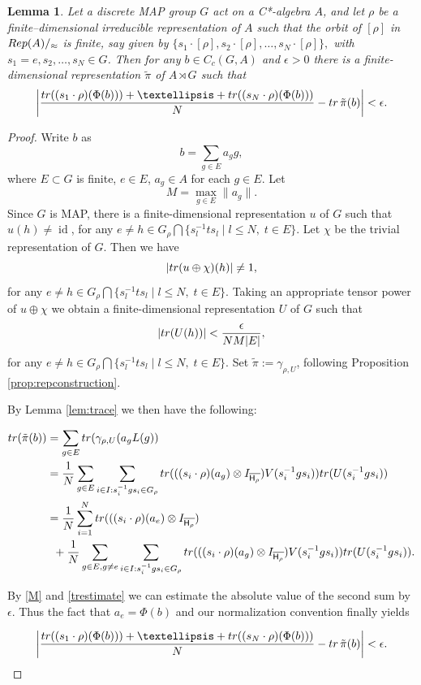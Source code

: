 \documentclass[11 pt, leqno, hidelinks]{amsart}%
\theoremstyle{plain}
\newtheorem{lemma}[theorem]{Lemma}
\numberwithin{equation}{section}
\newcommand{\tr}{\textup{tr}}
\newcommand{\Rep}{\textup{Rep}}
\newcommand{\id}[0]{\operatorname{id}}
\newcommand{\Hil}{\mathsf{H}}
\begin{document}
\begin{lemma}\label{MainLemma} Let a discrete MAP group $G$ act on a C*-algebra  $A$,  and let $\rho$ be a finite--dimensional irreducible representation of $A$ such that the orbit of $[\rho]$ in $\Rep(A)/_{\approx}$ is finite, say given by  $\{s_1\cdot [\rho], s_2\cdot[\rho], \ldots, s_N\cdot[\rho]\},$ with $s_1=e, s_2, \ldots, s_N \in G$. Then for any  $b\in C_c(G, A)$ and $\epsilon >0$ there is a finite-dimensional representation $\tilde\pi$ of $A\rtimes G$ such that
	$$\left|\frac{\tr ((s_1 \cdot\rho)(\Phi(b)))+\ldots + \tr((s_N \cdot\rho)(\Phi(b)))}{N} - \tr\,  \tilde\pi(b)\right| < \epsilon.$$
\end{lemma}
\begin{proof}
	Write $b$ as $$b = \sum_{g\in E} a_g g,$$ where $E\subset G$ is finite, $e \in E$, $ a_g \in A$ for each $g \in E$. Let
	\begin{equation}\label{M} M = \max_{g\in E} \|a_g\|.\end{equation}
	Since $G$ is MAP, there is  a finite-dimensional representation   $u$
	of $G$ such that $u(h) \neq \id$, for any $e\neq h\in G_{\rho}\bigcap \{s_l^{-1}ts_l\;|\; l\le N,\; t\in E\}$. Let $\chi$ be the trivial representation of $G$. Then we have
	$$|\tr ( u\oplus \chi)(h)|\neq 1,$$ for any $e\neq h\in G_{\rho}\bigcap \{s_l^{-1}ts_l\;|\; l\le N,\; t\in E\}$. Taking an appropriate tensor power of $ u \oplus \chi$ we obtain a finite-dimensional representation $U$ of $G$ such that
	\begin{equation}|\tr (U(h))|<\frac{\epsilon}{NM|E|},\label{trestimate}\end{equation} for any $e\neq h\in G_{\rho}\bigcap \{s_l^{-1}ts_l\;|\; l\le N,\; t\in E\}$.
	Set $\tilde{\pi}:=\gamma_{\rho, U}$, following Proposition \ref{prop:repconstruction}.
	
	By Lemma \ref{lem:trace} we then have the following:
	
	\begin{align*} \tr (\tilde \pi(b)) &= \sum_{g\in E}\tr (\gamma_{\rho, U}(a_gL(g)) \\&= \frac{1}{N} \sum_{g\in E} \sum_{i \in I: s_i^{-1}gs_i \in G_\rho}
		\textup{tr} (( (s_{i} \cdot \rho)(a_g) \otimes I_{\overline{\Hil_\rho}})V(s_i^{-1}g s_i))	\textup{tr}(U(s_i^{-1}g s_i))
		\\&= \frac{1}{N} \sum_{i=1}^N  \textup{tr} (( (s_{i} \cdot \rho)(a_e) \otimes I_{\overline{\Hil_\rho}}) \\&\;\;+   \frac{1}{N} \sum_{g\in E, g \neq e} \sum_{i \in I: s_i^{-1}gs_i \in G_\rho}
		\textup{tr} (( (s_{i} \cdot \rho)(a_g) \otimes I_{\overline{\Hil_\rho}})V(s_i^{-1}g s_i))	\textup{tr}(U(s_i^{-1}g s_i)).
	\end{align*}
	
	By \eqref{M} and \eqref{trestimate} we can  estimate the absolute value of the second sum by $\epsilon$. Thus the fact that $a_e = \Phi(b)$ and our normalization convention finally yields
	
	$$\left|\frac{\tr ((s_1 \cdot\rho)(\Phi(b)))+\ldots + \tr((s_N \cdot\rho)(\Phi(b)))}{N} - \tr\,  \tilde\pi(b)\right| < \epsilon.$$
	
\end{proof}
\end{document}
